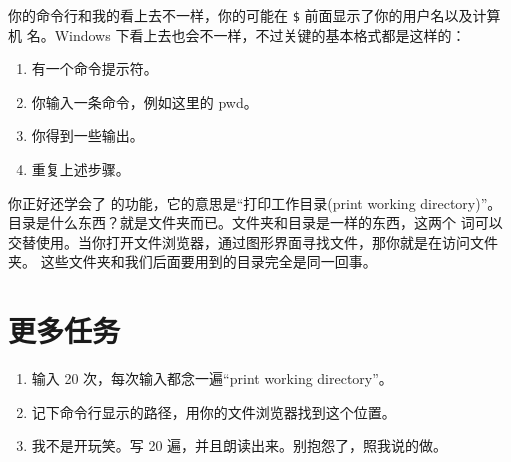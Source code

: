 你的命令行和我的看上去不一样，你的可能在 \verb|$| 前面显示了你的用户名以及计算机
名。Windows 下看上去也会不一样，不过关键的基本格式都是这样的：

\begin{enumerate}
\item 有一个命令提示符。
\item 你输入一条命令，例如这里的 pwd。
\item 你得到一些输出。
\item 重复上述步骤。
\end{enumerate}

你正好还学会了  的功能，它的意思是“打印工作目录(print working
directory)”。目录是什么东西？就是文件夹而已。文件夹和目录是一样的东西，这两个
词可以交替使用。当你打开文件浏览器，通过图形界面寻找文件，那你就是在访问文件夹。
这些文件夹和我们后面要用到的目录完全是同一回事。

\section{更多任务}

\begin{enumerate}
\item 输入  20 次，每次输入都念一遍“print working directory”。
\item 记下命令行显示的路径，用你的文件浏览器找到这个位置。
\item 我不是开玩笑。写 20 遍，并且朗读出来。别抱怨了，照我说的做。
\end{enumerate}


